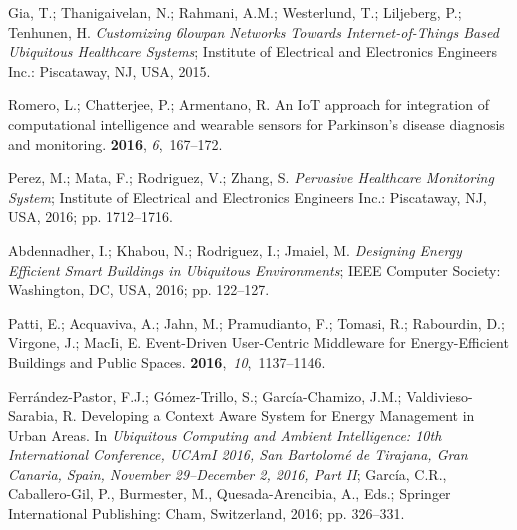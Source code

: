 \documentclass[symmetry,article,accept,moreauthors,pdftex10pt,a4paper]{mdpi}
\begin{document}
\begin{thebibliography}{999}
Gia, T.; Thanigaivelan, N.; Rahmani, A.M.; Westerlund, T.; Liljeberg, P.;
Tenhunen, H.
\newblock \emph{Customizing 6lowpan Networks Towards Internet-of-Things Based
	Ubiquitous Healthcare Systems};
\newblock Institute of Electrical and Electronics Engineers Inc.: Piscataway, NJ, USA, 2015.

Romero, L.; Chatterjee, P.; Armentano, R.
\newblock An IoT approach for integration of computational intelligence and
wearable sensors for Parkinson’s disease diagnosis and monitoring.
 {\bf 2016}, {\em 6},~167--172.

Perez, M.; Mata, F.; Rodriguez, V.; Zhang, S.
\newblock\emph{ Pervasive Healthcare Monitoring System};
\newblock Institute of Electrical and Electronics Engineers Inc.: Piscataway, NJ, USA, 2016; pp.
1712--1716.

Abdennadher, I.; Khabou, N.; Rodriguez, I.; Jmaiel, M.
\newblock \emph{Designing Energy Efficient Smart Buildings in Ubiquitous
	Environments};
\newblock IEEE Computer Society: Washington, DC, USA, 2016; pp. 122--127.

Patti, E.; Acquaviva, A.; Jahn, M.; Pramudianto, F.; Tomasi, R.; Rabourdin, D.;
Virgone, J.; MacIi, E.
\newblock Event-Driven User-Centric Middleware for Energy-Efficient Buildings
and Public Spaces.
 {\bf 2016},~{\em 10},~1137--1146.

Ferr{\'a}ndez-Pastor, F.J.; G{\'o}mez-Trillo, S.; Garc{\'i}a-Chamizo, J.M.;
Valdivieso-Sarabia, R. Developing a Context Aware System for Energy
Management in Urban Areas.
\newblock In {\em Ubiquitous Computing and Ambient Intelligence: 10th
	International Conference, UCAmI 2016, San Bartolom{\'e} de Tirajana, Gran
	Canaria, Spain, November 29--December 2, 2016, Part II}; Garc{\'i}a, C.R.,
Caballero-Gil, P., Burmester, M., Quesada-Arencibia, A., Eds.; Springer
International Publishing: Cham, Switzerland, 2016; pp. 326--331.


\end{thebibliography}
\end{document}
